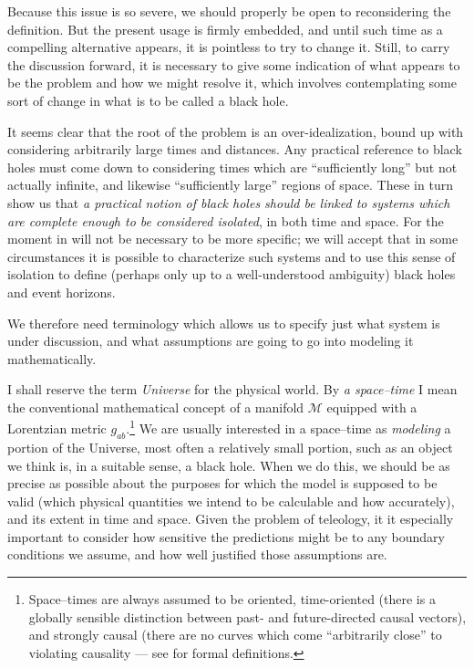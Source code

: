 \documentclass[12pt]{article}
\newcommand{\MM}{{\mathscr M}}
\begin{document}
Because this issue is so severe, we should properly be open to reconsidering the definition.  But the present usage is firmly embedded, and until such time as a compelling alternative appears, it is pointless to try to change it.  Still, to carry the discussion forward, it is necessary to give some indication of what appears to be the problem and how we might resolve it, which involves contemplating some sort of change in what is to be called a black hole.

It seems clear that the root of the problem is an over-idealization, bound up with considering arbitrarily large times and distances.  Any practical reference to black holes must come down to considering times which are ``sufficiently  long'' but not actually infinite, and likewise ``sufficiently large'' regions of space.  These in turn show us that {\em a practical notion of black holes should be linked to systems which are complete enough to be considered  isolated}, in both time and space.  For the moment in will not be necessary to be more specific; we will accept that in some circumstances it is possible to characterize such systems and to use this sense of isolation to define (perhaps only up to a 
well-understood ambiguity) black holes and event horizons.

We therefore need terminology which allows us to specify just what system is under discussion, and what assumptions are going to go into modeling it mathematically.

I shall reserve the term {\em Universe} for the physical world.  By {\em a space--time} I mean the conventional mathematical concept of a manifold $\MM$ equipped with a Lorentzian metric $g_{ab}$.\footnote{Space--times are always assumed to be oriented, time-oriented (there is a globally sensible distinction between past- and future-directed causal vectors), and strongly causal (there are no curves which come ``arbitrarily close'' to violating causality --- see \citet{Penrose:1972} for formal definitions.}  We are usually interested in a space--time as {\em modeling} a portion of the Universe, most often a relatively small portion, such as an object we think is, in a suitable sense, a black hole.  When we do this, we should be as precise as possible about the purposes for which the model is supposed to be valid (which physical quantities we intend to be calculable and how accurately), and its extent in time and space.  Given the problem of teleology, it it especially important to consider how sensitive the predictions might be to any boundary conditions we assume, and how well justified those assumptions are.  
\end{document}
